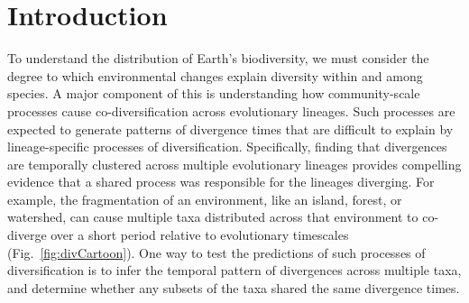 
\section{Introduction}

To understand the distribution of Earth's biodiversity, we must consider the
degree to which environmental changes explain diversity within and among
species.
A major component of this is understanding how community-scale processes cause
co-diversification across evolutionary lineages.
Such processes are expected to generate patterns of divergence times that are
difficult to explain by lineage-specific processes of diversification.
Specifically, finding that divergences are temporally clustered across
multiple evolutionary lineages provides compelling evidence that a shared
process was responsible for the lineages diverging.
For example, the fragmentation of an environment, like an island, forest, or
watershed, can cause multiple taxa distributed across that environment to
co-diverge over a short period relative to evolutionary timescales
(Fig.~\ref{fig:divCartoon}).
One way to test the predictions of such processes of diversification is to
infer the temporal pattern of divergences across multiple taxa, and determine
whether any subsets of the taxa shared the same divergence times.

\ifembed{

}{}

